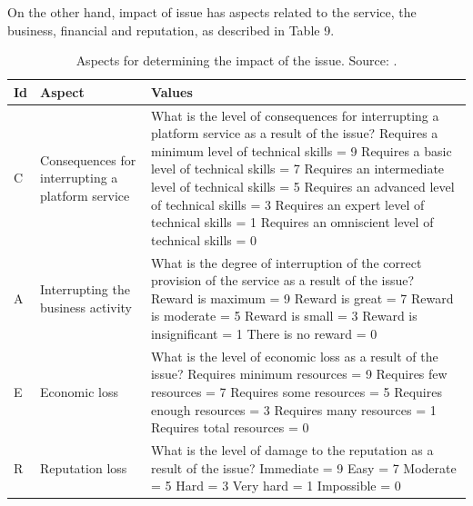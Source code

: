 \documentclass[preprint,10pt]{elsarticle}
\begin{document}
On the other hand, impact of issue has aspects related to the service, the business, financial and reputation, as described in Table 9.

\begin{table}[h!]
    \caption{Aspects for determining the impact of the issue. Source: .}
    \label{tab:9}
    \centering
    \begin{tabular}{llp{7cm}}
        \toprule
        \textbf{Id} & \textbf{Aspect} & \textbf{Values} \\
        \midrule
        C & Consequences for interrupting a platform service & What is the level of consequences for interrupting a platform service as a result of the issue? \newline Requires a minimum level of technical skills = 9 \newline Requires a basic level of technical skills = 7 \newline Requires an intermediate level of technical skills = 5 \newline Requires an advanced level of technical skills = 3 \newline Requires an expert level of technical skills = 1 \newline Requires an omniscient level of technical skills = 0 \\
        \addlinespace
        A & Interrupting the business activity & What is the degree of interruption of the correct provision of the service as a result of the issue? \newline Reward is maximum = 9 \newline Reward is great = 7 \newline Reward is moderate = 5 \newline Reward is small = 3 \newline Reward is insignificant = 1 \newline There is no reward = 0 \\
        \addlinespace
        E & Economic loss & What is the level of economic loss as a result of the issue? \newline Requires minimum resources = 9 \newline Requires few resources = 7 \newline Requires some resources = 5 \newline Requires enough resources = 3 \newline Requires many resources = 1 \newline Requires total resources = 0 \\
        \addlinespace
        R & Reputation loss & What is the level of damage to the reputation as a result of the issue? \newline Immediate = 9 \newline Easy = 7 \newline Moderate = 5 \newline Hard = 3 \newline Very hard = 1 \newline Impossible = 0 \\
        \bottomrule
    \end{tabular}
\end{table}
\end{document}
